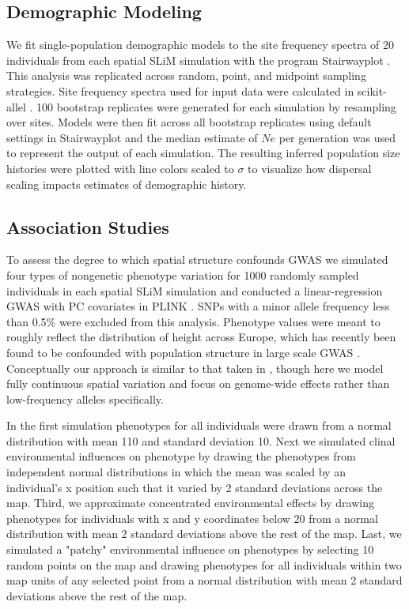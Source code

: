\documentclass[9pt,twocolumn,twoside,lineno]{gsajnl}
\begin{document}
\subsection{Demographic Modeling}
We fit single-population demographic models to the site frequency spectra of 20 individuals from each spatial SLiM simulation with the program Stairwayplot \citep{Liu2015}. This analysis was replicated across random, point, and midpoint sampling strategies. Site frequency spectra used for input data were calculated in scikit-allel \citep{Miles2017}. 100 bootstrap replicates were generated for each simulation by resampling over sites. Models were then fit across all bootstrap replicates using default settings in Stairwayplot and the median estimate of $Ne$ per generation was used to represent the output of each simulation. The resulting inferred population size histories were plotted with line colors scaled to $\sigma$ to visualize how dispersal scaling impacts estimates of demographic history.  

\subsection{Association Studies}
To assess the degree to which spatial structure confounds GWAS we simulated four types of nongenetic phenotype variation for 1000 randomly sampled individuals in each spatial SLiM simulation and conducted a linear-regression GWAS with PC covariates in PLINK \citep{PURCELL2007}. SNPs with a minor allele frequency less than 0.5\% were excluded from this analysis. Phenotype values were meant to roughly reflect the distribution of height across Europe, which has recently been found to be confounded with population structure in large scale GWAS \citep{Berg2018,Sohail2018}. Conceptually our approach is similar to that taken in \citep{Mathieson2012}, though here we model fully continuous spatial variation and focus on genome-wide effects rather than low-frequency alleles specifically. 

In the first simulation phenotypes for all individuals were drawn from a normal distribution with mean 110 and standard deviation 10. Next we simulated clinal environmental influences on phenotype by drawing the phenotypes from independent normal distributions in which the mean was scaled by an individual's x position such that it varied by 2 standard deviations across the map. Third, we approximate concentrated environmental effects by drawing phenotypes for individuals with x and y coordinates below 20 from a normal distribution with mean 2 standard deviations above the rest of the map. Last, we simulated a "patchy" environmental influence on phenotypes by selecting 10 random points on the map and drawing phenotypes for all individuals within two map units of any selected point from a normal distribution with mean 2 standard deviations above the rest of the map. 
\end{document}
